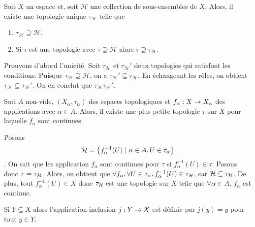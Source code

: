 \documentclass[french]{article}
\begin{document}
\begin{lemme}
  Soit $X$ un espace et, soit $\mathcal{H}$ une collection de sous-ensembles de $X$. Alors, il existe une topologie unique  $\tau_\mathcal{H}$ telle que
  \begin{enumerate}
    \item $\tau_\mathcal{H} \supseteq \mathcal{H}$.
    \item Si $\tau$ est une topologie avec $\tau \supseteq \mathcal{H}$ alors $\tau \supseteq \tau_\mathcal{H}$.
  \end{enumerate}

  \tcblower
  \begin{preuve}
    Prouvons d'abord l'unicité. Soit $\tau_\mathcal{H}$ et $\tau_\mathcal{H}'$ deux topologies qui satisfont les conditions. Puisque  $\tau_\mathcal{H} \supseteq \mathcal{H}$, on a $\tau_\mathcal{H}' \subseteq \tau_\mathcal{H}$. En échangeant les rôles, on obtient $\tau_\mathcal{H} \subseteq \tau_\mathcal{H}'$. On en conclut que $\tau_\mathcal{H} \tau_\mathcal{H}'$.
  \end{preuve}
\end{lemme}

\begin{lemme}
  Soit $A$ non-vide, $(X_\alpha, \tau_\alpha)$ des espaces topologiques et $f_\alpha: X \rightarrow X_\alpha$ des applications avec  $\alpha \in A$. Alors, il existe une plus petite topologie $\tau$ sur $X$ pour laquelle $f_\alpha$ sont continues.

  \tcblower
  \begin{preuve}
    Posons $$\mathcal{H} = \left\{ f_\alpha^{-1}(U) \mid \alpha \in A, U \in \tau_\alpha \right\}$$. On sait que les application $f_\alpha$ sont continues pour $\tau$ si  $f_\alpha^{-1}(U) \in \tau$. Posons donc $\tau = \tau_{\mathcal{H}}$. Alors, on obtient que  $\forall f_\alpha, \forall U \in \tau_\alpha, f_\alpha^{-1}(U) \in \tau_{\mathcal{H}}$, car $\mathcal{H} \subseteq \tau_{\mathcal{H}}$. De plus, tout $f_\alpha^{-1}(U) \in X$ donc $\tau_{\mathcal{H}}$ est une topologie sur  $X$ telle que  $\forall \alpha \in A$, $f_\alpha$ est continue.
  \end{preuve}
\end{lemme}

Si $Y \subseteq X$ alors l'application inclusion $j: Y \rightarrow X$ est définie par  $j(y) = y$ pour tout  $y \in Y$.
\end{document}
